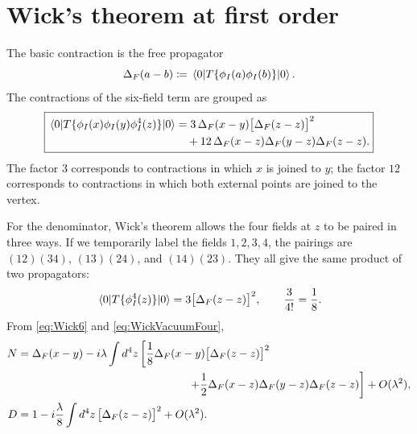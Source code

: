 \documentclass[11pt,letterpaper]{article}
\theoremstyle{definition}
\theoremstyle{definition}
\begin{document}
\section{Wick's theorem at first order}

The basic contraction is the free propagator
\begin{equation}
  \Delta_F(a-b)
  \coloneqq\mel{0}{T\{\phi_I(a)\phi_I(b)\}}{0}.
\end{equation}
The contractions of the six-field term are grouped as
\begin{equation}
  \boxed{\begin{aligned}
  \mel{0}{T\{\phi_I(x)\phi_I(y)\phi_I^4(z)\}}{0}
  &=3\,\Delta_F(x-y)\bigl[\Delta_F(z-z)\bigr]^2
  \\
  &\quad
  +12\,\Delta_F(x-z)\Delta_F(y-z)\Delta_F(z-z).
  \end{aligned}}
  \label{eq:Wick6}
\end{equation}
The factor $3$ corresponds to contractions in which $x$ is joined to $y$;
the factor $12$ corresponds to contractions in which both external
points are joined to the vertex.

For the denominator, Wick's theorem allows the four fields at $z$ to
be paired in three ways. If we temporarily label the fields $1,2,3,4$,
the pairings are $(12)(34)$, $(13)(24)$, and $(14)(23)$. They all give
the same product of two propagators:
\begin{equation}
  \mel{0}{T\{\phi_I^4(z)\}}{0}
  =3\bigl[\Delta_F(z-z)\bigr]^2,
  \qquad \frac{3}{4!}=\frac{1}{8}.
  \label{eq:WickVacuumFour}
\end{equation}
From \eqref{eq:Wick6} and \eqref{eq:WickVacuumFour},
\begin{align}
  N
  &=\Delta_F(x-y)
  -i\lambda\int d^4z\left[
    \frac{1}{8}\Delta_F(x-y)\bigl[\Delta_F(z-z)\bigr]^2
  \right.
  \notag\\
  &\hspace{5.4cm}\left.
    +\frac{1}{2}\Delta_F(x-z)\Delta_F(y-z)\Delta_F(z-z)
  \right]+O(\lambda^2),\\
  D
  &=1-i\frac{\lambda}{8}\int d^4z\,
  \bigl[\Delta_F(z-z)\bigr]^2+O(\lambda^2).
\end{align}
\end{document}

